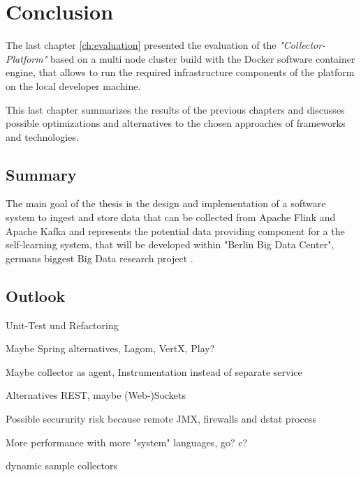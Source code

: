 \chapter{Conclusion}
\label{ch:conclusion}

The last chapter \autoref{ch:evaluation} presented the evaluation of the \textit{"Collector-Platform"} based on a multi node cluster
build with the Docker software container engine, that allows to run the required infrastructure components of the platform
on the local developer machine.

This last chapter summarizes the results of the previous chapters and discusses possible optimizations and alternatives to
the chosen approaches of frameworks and technologies.

\section{Summary}

The main goal of the thesis is the design and implementation of a software system
to ingest and store data that can be collected from Apache Flink and Apache Kafka and
represents the potential data providing component for a the self-learning system, that will be developed within "Berlin Big Data Center",
germans biggest Big Data research project .




\section{Outlook}

Unit-Test und Refactoring

Maybe Spring alternatives, Lagom, VertX, Play?

Maybe collector as agent, Instrumentation instead of separate service

Alternatives REST, maybe (Web-)Sockets

Possible secururity risk because remote JMX, firewalls and dstat process

More performance with more "system" languages, go? c?

dynamic sample collectors

